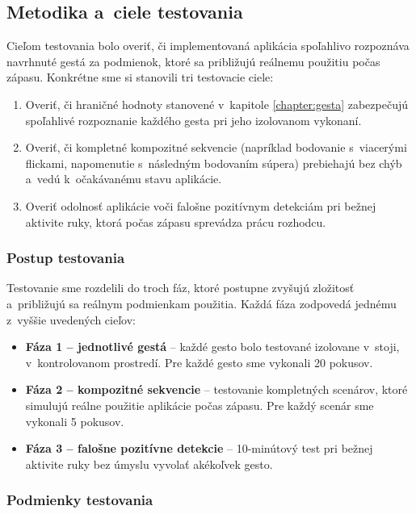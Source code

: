 \subsection{Metodika a~ciele testovania}
\label{subsec:metodika}

Cieľom testovania bolo overiť, či implementovaná
aplikácia spoľahlivo rozpoznáva navrhnuté gestá
za podmienok, ktoré sa približujú reálnemu použitiu
počas zápasu. Konkrétne sme si stanovili tri
testovacie ciele:

\begin{enumerate}
  \item Overiť, či hraničné hodnoty stanovené v~kapitole
        \ref{chapter:gesta} zabezpečujú spoľahlivé
        rozpoznanie každého gesta pri jeho izolovanom
        vykonaní.
  \item Overiť, či kompletné kompozitné sekvencie
        (napríklad bodovanie s~viacerými flickami,
        napomenutie s~následným bodovaním súpera) prebiehajú
        bez chýb a~vedú k~očakávanému stavu aplikácie.
  \item Overiť odolnosť aplikácie voči falošne pozitívnym
        detekciám pri bežnej aktivite ruky, ktorá počas
        zápasu sprevádza prácu rozhodcu.
\end{enumerate}

\subsubsection{Postup testovania}

Testovanie sme rozdelili do troch fáz, ktoré
postupne zvyšujú zložitosť a~približujú sa reálnym
podmienkam použitia. Každá fáza zodpovedá jednému
z~vyššie uvedených cieľov:

\begin{itemize}
  \item \textbf{Fáza 1 -- jednotlivé gestá} -- každé gesto
        bolo testované izolovane v~stoji, v~kontrolovanom
        prostredí. Pre každé gesto sme vykonali 20 pokusov.
  \item \textbf{Fáza 2 -- kompozitné sekvencie} -- testovanie
        kompletných scenárov, ktoré simulujú reálne použitie
        aplikácie počas zápasu. Pre každý scenár sme
        vykonali 5 pokusov.
  \item \textbf{Fáza 3 -- falošne pozitívne detekcie} --
        10-minútový test pri bežnej aktivite ruky bez
        úmyslu vyvolať akékoľvek gesto.
\end{itemize}

\subsubsection{Podmienky testovania}

